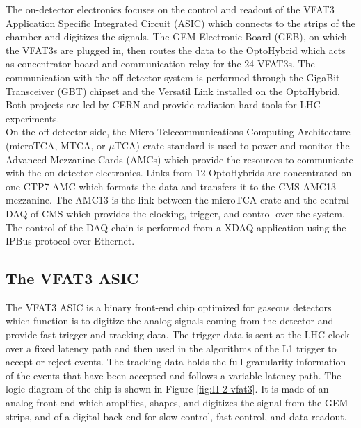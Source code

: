     The on-detector electronics focuses on the control and readout of the VFAT3 Application Specific Integrated Circuit (ASIC) which connects to the strips of the chamber and digitizes the signals. The GEM Electronic Board (GEB), on which the VFAT3s are plugged in, then routes the data to the OptoHybrid which acts as concentrator board and communication relay for the 24 VFAT3s. The communication with the off-detector system is performed through the GigaBit Transceiver (GBT) chipset and the Versatil Link installed on the OptoHybrid. Both projects are led by CERN and provide radiation hard tools for LHC experiments. \\

    On the off-detector side, the Micro Telecommunications Computing Architecture (microTCA, MTCA, or $\mu$TCA) \cite{PICMG} crate standard is used to power and monitor the Advanced Mezzanine Cards (AMCs) which provide the resources to communicate with the on-detector electronics. Links from 12 OptoHybrids are concentrated on one CTP7 AMC which formats the data and transfers it to the CMS AMC13 mezzanine. The AMC13 is the link between the microTCA crate and the central DAQ of CMS which provides the clocking, trigger, and control over the system. The control of the DAQ chain is performed from a XDAQ application using the IPBus protocol over Ethernet.

    \subsection{The VFAT3 ASIC}

      The VFAT3 ASIC is a binary front-end chip optimized for gaseous detectors which function is to digitize the analog signals coming from the detector and provide fast trigger and tracking data. The trigger data is sent at the LHC clock over a fixed latency path and then used in the algorithms of the L1 trigger to accept or reject events. The tracking data holds the full granularity information of the events that have been accepted and follows a variable latency path. The logic diagram of the chip is shown in Figure \ref{fig:II-2-vfat3}. It is made of an analog front-end which amplifies, shapes, and digitizes the signal from the GEM strips, and of a digital back-end for slow control, fast control, and data readout. \\

